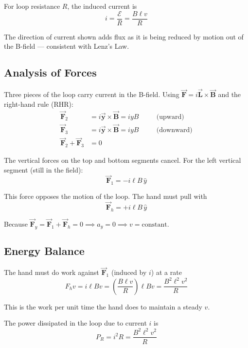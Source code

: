 \documentclass[11pt]{report}
\newcommand{\vbf}[1]{\vec{\mathbf{#1}}}
\begin{document}
For loop resistance $R$, the induced current is
\begin{equation}
\boxed{i = \frac{\mathcal{E}}{R} = \frac{B\ell v}{R}}
\end{equation}

The direction of current shown adds flux as it is being reduced by motion out of the B-field --- consistent with Lenz's Law.

\subsection*{Analysis of Forces}

Three pieces of the loop carry current in the B-field. Using $\vbf{F} = i\vbf{L} \times \vbf{B}$ and the right-hand rule (RHR):
\begin{align}
\vbf{F}_2 &= i\vbf{y} \times \vbf{B} = iyB \quad &&\text{(upward)} \\
\vbf{F}_3 &= i\vbf{y} \times \vbf{B} = iyB \quad &&\text{(downward)} \\
\vbf{F}_2 + \vbf{F}_3 &= 0
\end{align}

The vertical forces on the top and bottom segments cancel. For the left vertical segment (still in the field):
\begin{equation}
\vbf{F}_1 = -i\ell B \,\hat{y}
\end{equation}

This force opposes the motion of the loop. The hand must pull with
\begin{equation}
\vbf{F}_h = +i\ell B \,\hat{y}
\end{equation}

Because $\vbf{F}_y = \vbf{F}_1 + \vbf{F}_h = 0 \implies a_y = 0 \implies v = \text{constant}$.

\subsection*{Energy Balance}

The hand must do work against $\vbf{F}_1$ (induced by $i$) at a rate
\begin{equation}
F_h v = i\ell B v = \left(\frac{B\ell v}{R}\right)\ell B v = \frac{B^2 \ell^2 v^2}{R}
\end{equation}

This is the work per unit time the hand does to maintain a steady $v$.

The power dissipated in the loop due to current $i$ is
\begin{equation}
P_R = i^2 R = \frac{B^2 \ell^2 v^2}{R}
\end{equation}
\end{document}
